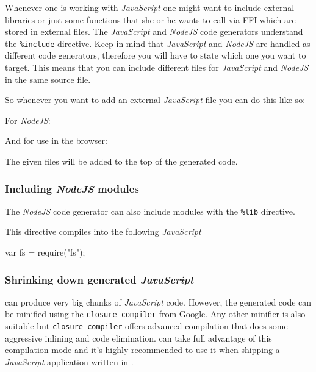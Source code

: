\noindent
Whenever one is working with \emph{JavaScript} one might want to include
external libraries or just some functions that she or he wants to call via
FFI which are stored in external files. The \emph{JavaScript} and \emph{NodeJS} code generators
understand the \texttt{\%include} directive. Keep in mind that \emph{JavaScript} and \emph{NodeJS}
are handled as different code generators, therefore you will have to state which one you want to target.
This means that you can include different files for \emph{JavaScript} and \emph{NodeJS} in the same
\Idris{} source file.

\noindent
So whenever you want to add an external \emph{JavaScript} file
you can do this like so:

\noindent
For \emph{NodeJS}:

\begin{code}
\end{code}

\noindent
And for use in the browser:

\begin{code}
\end{code}

\noindent
The given files will be added to the top of the generated code.

\subsubsection*{Including \emph{NodeJS} modules}

\noindent
The \emph{NodeJS} code generator can also include modules with the \texttt{\%lib}
directive.

\begin{code}
\end{code}

\noindent
This directive compiles into the following \emph{JavaScript}

\begin{code}
  var fs = require("fs");
\end{code}

\subsubsection*{Shrinking down generated \emph{JavaScript}}

\Idris{} can produce very big chunks of \emph{JavaScript} code.
However, the generated code can be minified using the \texttt{closure-compiler} from Google.
Any other minifier is also suitable but \texttt{closure-compiler} offers advanced compilation that does some aggressive inlining and code elimination.
\Idris{} can take full advantage of this compilation mode and it's highly recommended to use it when shipping a \emph{JavaScript} application written in \Idris{}.

